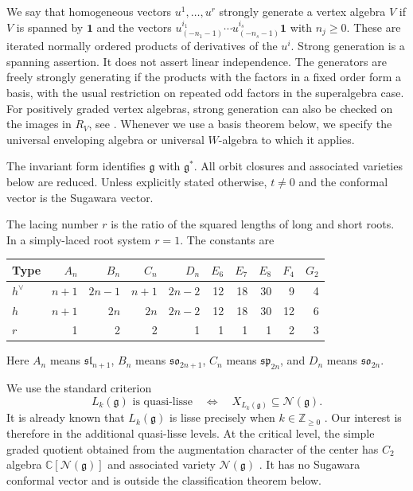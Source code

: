 \documentclass[11pt,a4paper]{amsart}
\numberwithin{equation}{section}
\theoremstyle{definition}
\theoremstyle{remark}
\newcommand{\C}{\mathbb C}
\newcommand{\Z}{\mathbb Z}
\newcommand{\g}{\mathfrak g}
\newcommand{\N}{\mathcal N}
\newcommand{\spg}{\mathfrak{sp}}
\newcommand{\sog}{\mathfrak{so}}
\newcommand{\slg}{\mathfrak{sl}}
\begin{document}
We say that homogeneous vectors $u^1,\ldots,u^r$ strongly generate a
vertex algebra $V$ if $V$ is spanned by $\mathbf1$ and the vectors
$u^{i_1}_{(-n_1-1)}\cdots u^{i_s}_{(-n_s-1)}\mathbf1$ with $n_j\ge0$. 
These are iterated normally ordered products of derivatives of the
$u^i$. Strong generation is a spanning assertion. It does not assert
linear independence. The generators are freely strongly generating if
the products with the factors in a fixed order form a basis, with the
usual restriction on repeated odd factors in the superalgebra case.
For positively graded vertex algebras, strong generation can also be
checked on the images in $R_V$, see \cite[Section~2.3]{AAV}.
Whenever we use a basis theorem below, we specify the universal
enveloping algebra or universal $W$-algebra to which it applies.

The invariant form identifies $\g$ with $\g^*$. All orbit closures and
associated varieties below are reduced. Unless explicitly stated otherwise, $t\ne0$ and the conformal vector
is the Sugawara vector.

The lacing number $r$ is the ratio of the squared lengths of long and short
roots. In a simply-laced root system $r=1$. The constants are
\begin{center}
\begin{tabular}{@{}lrrrrrrrrr@{}}\toprule
Type&$A_n$&$B_n$&$C_n$&$D_n$&$E_6$&$E_7$&$E_8$&$F_4$&$G_2$\\\midrule
$h^\vee$&$n+1$&$2n-1$&$n+1$&$2n-2$&12&18&30&9&4\\
$h$&$n+1$&$2n$&$2n$&$2n-2$&12&18&30&12&6\\
$r$&1&2&2&1&1&1&1&2&3\\\bottomrule
\end{tabular}
\end{center}
Here $A_n$ means $\slg_{n+1}$, $B_n$ means $\sog_{2n+1}$,
$C_n$ means $\spg_{2n}$, and $D_n$ means $\sog_{2n}$.


We use the standard criterion \cite[Lemma~6.1]{AK}
\begin{equation}\label{eq:nilpotent-criterion}
 L_k(\g)\text{ is quasi-lisse}
 \quad\Longleftrightarrow\quad X_{L_k(\g)}\subseteq\N(\g).
\end{equation}
It is already known that $L_k(\g)$ is lisse precisely when
$k\in\Z_{\ge0}$ \cite{AAV}. Our interest is therefore in the additional
quasi-lisse levels. At the critical level, the simple
graded quotient obtained from the augmentation character of the center
has $C_2$ algebra $\C[\N(\g)]$ and associated variety $\N(\g)$
\cite[Section~2 and Theorem~1.2]{Critical}. It has no Sugawara conformal
vector and is outside the classification theorem below.
\end{document}
